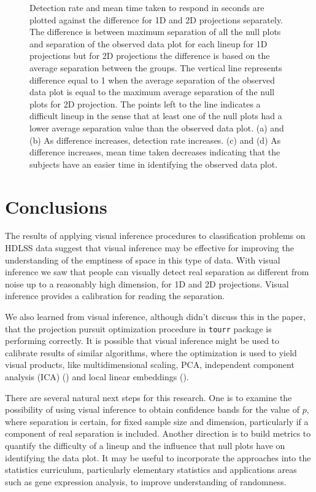 \begin{figure}[htbp]
{}
\caption{Detection rate and mean time taken to respond in seconds are plotted against the difference for 1D and 2D projections separately. The difference is between maximum separation of all the null plots and separation of the observed data plot for each lineup for 1D projections but for 2D projections the difference is based on the average separation between the groups. The vertical line represents difference equal to 1 when the average separation of the observed data plot is equal to the maximum average separation of the null plots for 2D projection. The points left to the line indicates a difficult lineup in the sense that at least one of the null plots had a lower average separation value than the observed data plot. (a) and (b) As difference increases, detection rate increases. (c) and (d) As difference increases,  mean time taken decreases indicating that the subjects have an easier time in identifying the observed data plot. }
\label{null}
\end{figure}

\section{Conclusions}

The results of applying visual inference procedures to classification problems on HDLSS data suggest that visual inference may be effective for improving the understanding of the emptiness of space in this type of data. With visual inference we saw that people can visually detect real separation as different from noise up to a reasonably high dimension, for 1D and 2D projections. Visual inference provides a calibration for reading the separation. 

We also learned from visual inference, although didn't discuss this in the paper, that the projection pursuit optimization procedure in \texttt{tourr} package is performing correctly. It is possible that visual inference might be used to calibrate results of similar algorithms, where the optimization is used to yield visual products, like multidimensional scaling, PCA, independent component analysis (ICA) (\cite{comon:1994}) and local linear embeddings (\cite{roweis:2000}).

There are several natural next steps for this research. One is to examine the possibility of using visual inference to obtain confidence bands for the value of $p$, where separation is certain, for fixed sample size and dimension, particularly if a component of real separation is included. Another direction is to build metrics to quantify the difficulty of a lineup and the influence that null plots have on identifying the data plot. It may be useful to incorporate the approaches into the statistics curriculum, particularly elementary statistics and applications areas such as gene expression analysis, to improve understanding of randomness. 



